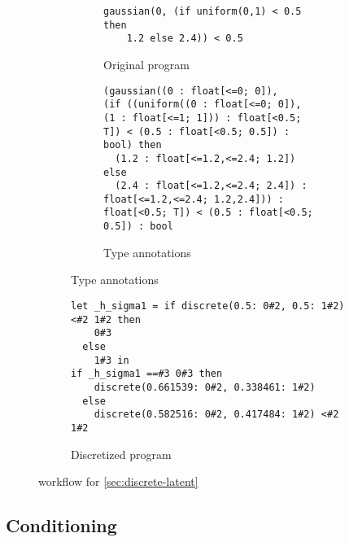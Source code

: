 \documentclass[acmsmall,screen,dvipsnames,x11names,nonacm,anonymous,review]{acmart}
\newcommand{\contdice}{\text{\scshape ContDice}\xspace}
\begin{document}
\begin{figure}[ht]
\centering
\begin{subfigure}[t]{0.48\textwidth}  %
  \centering
  \begin{subfigure}[t]{\textwidth}
    \begin{lstlisting}
gaussian(0, (if uniform(0,1) < 0.5 then 
    1.2 else 2.4)) < 0.5
    \end{lstlisting}
    \caption{Original program}
    \label{fig:subA}
  \end{subfigure}

  \vspace{2em} %

  \begin{subfigure}[t]{\textwidth}
  \begin{lstlisting}
(gaussian((0 : float[<=0; 0]), 
(if ((uniform((0 : float[<=0; 0]), (1 : float[<=1; 1])) : float[<0.5; T]) < (0.5 : float[<0.5; 0.5]) : bool) then
  (1.2 : float[<=1.2,<=2.4; 1.2])
else
  (2.4 : float[<=1.2,<=2.4; 2.4]) : float[<=1.2,<=2.4; 1.2,2.4])) : float[<0.5; T]) < (0.5 : float[<0.5; 0.5]) : bool
\end{lstlisting}
    \caption{Type annotations}
    \label{fig:subC}
  \end{subfigure}
\end{subfigure}
\hfill
\begin{subfigure}[t]{0.48\textwidth}
    \begin{lstlisting}
let _h_sigma1 = if discrete(0.5: 0#2, 0.5: 1#2) <#2 1#2 then
    0#3
  else
    1#3 in
if _h_sigma1 ==#3 0#3 then
    discrete(0.661539: 0#2, 0.338461: 1#2)
  else
    discrete(0.582516: 0#2, 0.417484: 1#2) <#2 1#2
    \end{lstlisting}

  \caption{Discretized program}
  \label{fig:subB}
\end{subfigure}

\caption{\contdice workflow for \ref{sec:discrete-latent}}
\label{fig:main}
\end{figure}


\subsection{Conditioning}
\label{sec:observe}
\end{document}
